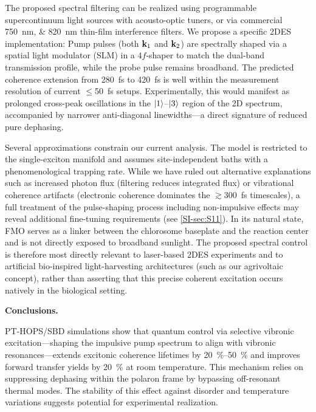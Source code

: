 \documentclass[journal=jpcl,manuscript=letter]{achemso}
\begin{document}
The proposed spectral filtering can be realized using programmable supercontinuum light sources with acousto-optic tuners,\cite{Gunthardt2023} or via commercial \SIlist{750;820}{\nano\meter} thin-film interference filters. We propose a specific 2DES implementation:\cite{Sebastian2024} Pump pulses (both $\vb{k}_1$ and $\vb{k}_2$) are spectrally shaped via a spatial light modulator (SLM) in a $4f$-shaper to match the dual-band transmission profile, while the probe pulse remains broadband.
The predicted coherence extension from \SI{280}{\femto\second} to \SI{420}{\femto\second} is well within the measurement resolution of current $\leq$\SI{50}{\femto\second} setups.\cite{Engel2007} Experimentally, this would manifest as prolonged cross-peak oscillations in the $\ket{1}$--$\ket{3}$ region of the 2D spectrum, accompanied by narrower anti-diagonal linewidths—a direct signature of reduced pure dephasing. 

Several approximations constrain our current analysis. The model is restricted to the single-exciton manifold and assumes site-independent baths with a phenomenological trapping rate. While we have ruled out alternative explanations such as increased photon flux (filtering reduces integrated flux) or vibrational coherence artifacts (electronic coherence dominates the $\gtrsim$\SI{300}{\femto\second} timescales), a full treatment of the pulse-shaping process including non-impulsive effects may reveal additional fine-tuning requirements (see \cref{SI-sec:S11}). In its natural state, FMO serves as a linker between the chlorosome baseplate and the reaction center and is not directly exposed to broadband sunlight.\cite{Blankenship2011} The proposed spectral control is therefore most directly relevant to laser-based 2DES experiments and to artificial bio-inspired light-harvesting architectures (such as our agrivoltaic concept), rather than asserting that this precise coherent excitation occurs natively in the biological setting.

\textbf{Conclusions.}

PT-HOPS/SBD simulations show that quantum control via selective vibronic excitation---shaping the impulsive pump spectrum to align with vibronic resonances---extends excitonic coherence lifetimes by \SIrange{20}{50}{\percent} and improves forward transfer yields by \SI{20}{\percent} at room temperature. This mechanism relies on suppressing dephasing within the polaron frame by bypassing off-resonant thermal modes. The stability of this effect against disorder and temperature variations suggests potential for experimental realization.
\end{document}
